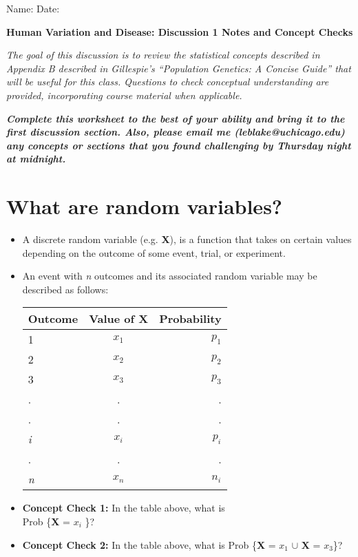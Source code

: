 \documentclass[12pt]{report}
\begin{document}
Name: \hrulefill
Date: \hrulefill

\begin{center}

\bigskip
\large{\textbf{Human Variation and Disease: Discussion 1 Notes and Concept Checks}}

\bigskip
\normalsize{\textit{The goal of this discussion is to review the statistical concepts described in Appendix B described in Gillespie's ``Population Genetics: A Concise Guide'' that will be useful for this class. Questions to check conceptual understanding are provided, incorporating course material when applicable.}}

\bigskip
\normalsize{\textbf{\textit{Complete this worksheet to the best of your ability and bring it to the first discussion section. Also, please email me (leblake@uchicago.edu) any concepts or sections that you found challenging by Thursday night at midnight. }}}

\end{center}

\section{What are random variables?}

\begin{itemize}

\item A discrete random variable (e.g. \textbf{X}), is a function that takes on certain values depending on the outcome of some event, trial, or experiment.

\item An event with \textit{n} outcomes and its associated random variable may be described as follows:

\begin{tabular}{| l | c | r |}
	\hline
 Outcome & Value of \textbf{X} & Probability \\ \hline
  1 & \textit{$x_{1}$} & \textit{$p_{1}$} \\
  2 & \textit{$x_{2}$}  & \textit{$p_{2}$} \\
  3 & \textit{$x_{3}$} & \textit{$p_{3}$} \\
  . & . & . \\
  . & . & . \\
  \textit{i} & \textit{$x_{i}$}  & \textit{$p_{i}$} \\
  . & .  & . \\
  \textit{n} & \textit{$x_{n}$}  & \textit{$n_{i}$} \\ \hline
\end{tabular}

\bigskip

\item \textbf{Concept Check 1:} In the table above, what is \\ Prob \{{\textbf{X} = \textit{$x_{i}$} }\}? \hrulefill

\item \textbf{Concept Check 2:} In the table above, what is Prob \{{\textbf{X} = \textit{$x_{1}$} $\cup$ \textbf{X} = \textit{$x_{3}$}}\}? \hrulefill

\end{itemize}
\end{document}
